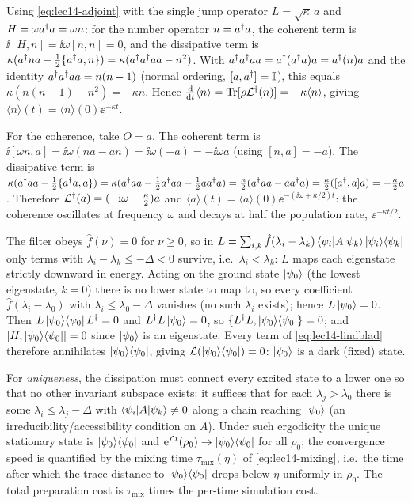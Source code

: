 \begin{solution}
Using \eqref{eq:lec14-adjoint} with the single jump operator $L=\sqrt\kappa\,a$ and $H=\omega a^{\dagger}
a=\omega n$: for the number operator $n=a^{\dagger} a$, the coherent term is $\ii[H,n]=\ii\omega[n,n]=0$,
and the dissipative term is $\kappa(a^{\dagger} n a-\tfrac12\{a^{\dagger} a,n\})=\kappa(a^{\dagger} a^{\dagger} a a-n^2)$.
With $a^{\dagger} a^{\dagger} a a=a^{\dagger}(a^{\dagger} a)a=a^{\dagger}(n)a$ and the identity $a^{\dagger} a^{\dagger} aa=n(n-1)$ (normal
ordering, $[a,a^{\dagger}]=\mathbb{I}$), this equals $\kappa(n(n-1)-n^2)=-\kappa n$. Hence
$\tfrac{\mathrm{d}}{\mathrm{d} t}\langle n\rangle=\operatorname{Tr}[\rho\mathcal L^{\dagger}(n)]=-\kappa\langle n\rangle$, giving
$\langle n\rangle(t)=\langle n\rangle(0)\ee^{-\kappa t}$.

For the coherence, take $O=a$. The coherent term is $\ii[\omega n,a]=\ii\omega(na-an)
=\ii\omega(-a)=-\ii\omega a$ (using $[n,a]=-a$). The dissipative term is
$\kappa(a^{\dagger} a a-\tfrac12\{a^{\dagger} a,a\})=\kappa(a^{\dagger} a a-\tfrac12 a^{\dagger} a a-\tfrac12 a a^{\dagger} a)
=\tfrac\kappa2(a^{\dagger} a a-a a^{\dagger} a)=\tfrac\kappa2([a^{\dagger},a]a)=-\tfrac\kappa2 a$. Therefore
$\mathcal L^{\dagger}(a)=(-\mathrm{i}\omega-\tfrac\kappa2)a$ and $\langle a\rangle(t)=\langle a\rangle(0)
\ee^{-(\ii\omega+\kappa/2)t}$: the coherence oscillates at frequency $\omega$ and decays at half
the population rate, $\ee^{-\kappa t/2}$.
\end{solution}

\begin{solution}
The filter obeys $\hat f(\nu)=0$ for $\nu\ge0$, so in $L=\sum_{i,k}\hat f(\lambda_i-\lambda_k)
\braket{\psi_i|A|\psi_k}\ket{\psi_i}\!\bra{\psi_k}$ only terms with $\lambda_i-\lambda_k\le-\Delta
<0$ survive, i.e.\ $\lambda_i<\lambda_k$: $L$ maps each eigenstate strictly downward in energy.
Acting on the ground state $\ket{\psi_0}$ (the lowest eigenstate, $k=0$) there is no lower state
to map to, so every coefficient $\hat f(\lambda_i-\lambda_0)$ with $\lambda_i\le\lambda_0-\Delta$
vanishes (no such $\lambda_i$ exists); hence $L\ket{\psi_0}=0$. Then $L\ket{\psi_0}\!\bra{\psi_0}L^{\dagger}=0$ and
$L^{\dagger} L\ket{\psi_0}=0$, so $\{L^{\dagger} L,\ket{\psi_0}\!\bra{\psi_0}\}=0$; and $[H,\ket{\psi_0}\!\bra{\psi_0}]=0$ since
$\ket{\psi_0}$ is an eigenstate. Every term of \eqref{eq:lec14-lindblad} therefore annihilates
$\ket{\psi_0}\!\bra{\psi_0}$, giving $\mathcal L(\ket{\psi_0}\!\bra{\psi_0})=0$: $\ket{\psi_0}$ is a dark (fixed) state.

For \emph{uniqueness}, the dissipation must connect every excited state to a lower one so that no
other invariant subspace exists: it suffices that for each $\lambda_j>\lambda_0$ there is some
$\lambda_i\le\lambda_j-\Delta$ with $\braket{\psi_i|A|\psi_k}\ne0$ along a chain reaching
$\ket{\psi_0}$ (an irreducibility/accessibility condition on $A$). Under such ergodicity the
unique stationary state is $\ket{\psi_0}\!\bra{\psi_0}$ and $\mathrm{e}^{\mathcal L t}(\rho_0)\to\ket{\psi_0}\!\bra{\psi_0}$ for all
$\rho_0$; the convergence speed is quantified by the mixing time $\tau_{\mathrm{mix}}(\eta)$ of
\eqref{eq:lec14-mixing}, i.e.\ the time after which the trace distance to $\ket{\psi_0}\!\bra{\psi_0}$ drops
below $\eta$ uniformly in $\rho_0$. The total preparation cost is $\tau_{\mathrm{mix}}$ times the
per-time simulation cost.
\end{solution}

